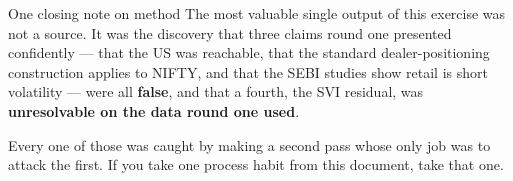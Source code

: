 \documentclass[11pt,a4paper]{article}
\begin{document}
\vspace{1.5em}
\begin{keyfact}{One closing note on method}
The most valuable single output of this exercise was not a source. It was the
discovery that three claims round one presented confidently --- that the US was
reachable, that the standard dealer-positioning construction applies to NIFTY, and
that the SEBI studies show retail is short volatility --- were all \textbf{false},
and that a fourth, the SVI residual, was \textbf{unresolvable on the data round one
used}.

Every one of those was caught by making a second pass whose only job was to attack
the first. If you take one process habit from this document, take that one.
\end{keyfact}
\end{document}
